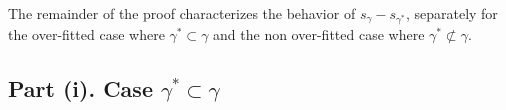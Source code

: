 
The remainder of the proof characterizes the behavior of $s_\gamma - s_{\gamma^*}$, separately for the over-fitted case where $\gamma^* \subset \gamma$ and the non over-fitted case where $\gamma^* \not\subset \gamma$.


\subsection{Part (i). Case $\gamma^* \subset \gamma$}

